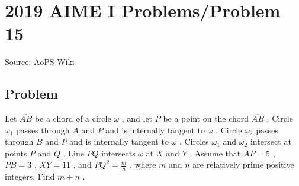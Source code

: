 \documentclass[12pt]{article}
\begin{document}
\section*{{2019 AIME I Problems/Problem 15}}
Source: AoPS Wiki

\subsection*{Problem}
Let $\overline{AB}$ be a chord of a circle $\omega$ , and let $P$ be a point on the chord $\overline{AB}$ . Circle $\omega_1$ passes through $A$ and $P$ and is internally tangent to $\omega$ . Circle $\omega_2$ passes through $B$ and $P$ and is internally tangent to $\omega$ . Circles $\omega_1$ and $\omega_2$ intersect at points $P$ and $Q$ . Line $PQ$ intersects $\omega$ at $X$ and $Y$ . Assume that $AP=5$ , $PB=3$ , $XY=11$ , and $PQ^2 = \frac{m}{n}$ , where $m$ and $n$ are relatively prime positive integers. Find $m+n$ .
\end{document}
